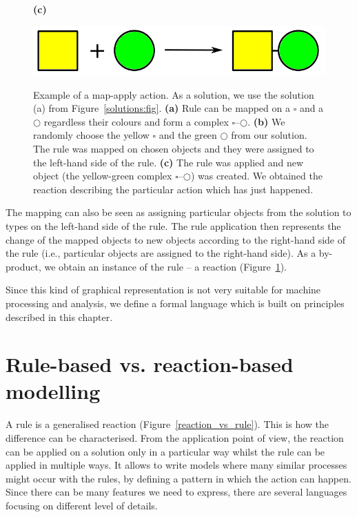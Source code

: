 \documentclass[12pt, twoside]{fithesis2} %
\begin{document}
\begin{figure}[!h]
\begin{center}
\begin{minipage}[l]{0.1\textwidth}
    \textbf{(c)}
  \end{minipage}
  \begin{minipage}[r]{0.6\textwidth}
    {\hspace*{1.3cm}\includegraphics[scale=0.2]{pics/rule_reaction}}
\end{minipage}
\end{center}
\caption{Example of a map-apply action. As a solution, we use the solution (a) from Figure~\ref{solutions:fig}. \textbf{(a)} Rule can be mapped on a {\large $\square$} and a $\bigcirc$ regardless their colours and form a complex {\large $\square$}--$\bigcirc$.  \textbf{(b)} We randomly choose the yellow {\large $\square$} and the green $\bigcirc$ from our solution. The rule was mapped on chosen objects and they were assigned to the left-hand side of the rule. \textbf{(c)} The rule was applied and new object (the yellow-green complex {\large $\square$}--$\bigcirc$) was created. We obtained the reaction describing the particular action which has just happened.}\label{map-apply:fig}
\end{figure}

The mapping can also be seen as assigning particular objects from the solution to types on the left-hand side of the rule. The rule application then represents the change of the mapped objects to new objects according to the right-hand side of the rule (i.e., particular objects are assigned to the right-hand side). As a by-product, we obtain an instance of the rule -- a reaction (Figure~\ref{map-apply:fig}).

Since this kind of graphical representation is not very suitable for machine processing and analysis, we define a formal language which is built on principles described in this chapter.

\section{Rule-based vs. reaction-based modelling}

A rule is a generalised reaction (Figure~\ref{reaction_vs_rule}). This is how the difference can be characterised. From the application point of view, the reaction can be applied on a solution only in a particular way whilst the rule can be applied in multiple ways. It allows to write models where many similar processes might occur with the rules, by defining a pattern in which the action can happen. Since there can be many features we need to express, there are several languages focusing on different level of details.
\end{document}
